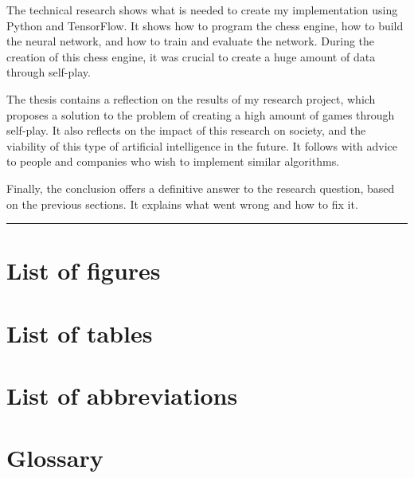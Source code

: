 \documentclass{article}
\makeatletter
\renewcommand\tableofcontents{%
  \null\hfill\textbf{\Huge\contentsname}\hfill\null\par
  \vline\noexpand\rule{\textwidth}{1pt}%
  \@mkboth{\MakeUppercase\contentsname}{\MakeUppercase\contentsname}%
  \@starttoc{toc}%
}
\makeatother
\begin{document}
The technical research shows what is needed to create my implementation using Python and TensorFlow. 
It shows how to program the chess engine, how to build the neural network, and how to train and evaluate the network.
During the creation of this chess engine, it was crucial to create a huge amount of data through self-play.


The thesis contains a reflection on the results of my research project, which proposes a solution to the problem of
creating a high amount of games through self-play. It also reflects on the impact of this research on society, and the
viability of this type of artificial intelligence in the future. It follows with advice to people and companies who wish to implement similar algorithms. 

Finally, the conclusion offers a definitive answer to the research question, based on the previous sections.
It explains what went wrong and how to fix it. 

\newpage
\thispagestyle{empty}
\mbox{}
\newpage

\tableofcontents
\newpage

\section*{List of figures}
\renewcommand{\listfigurename}{}
\listoffigures

\section*{List of tables}
\renewcommand{\listtablename}{}
\listoftables

\newpage
\section*{List of abbreviations}



\newpage
\section*{Glossary}
\end{document}
